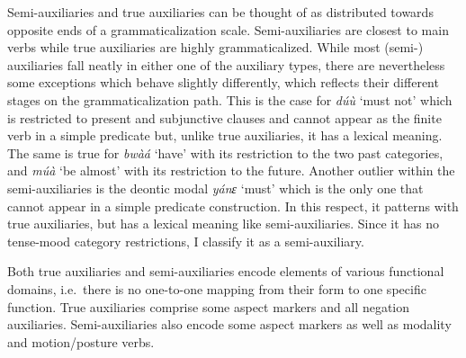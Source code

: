 Semi-auxiliaries and true auxiliaries can be thought of as distributed towards opposite ends of a grammaticalization scale. Semi-auxiliaries are closest to main verbs while true auxiliaries are highly grammaticalized. 
While most (semi-) auxiliaries fall neatly in either one of the auxiliary types, there are nevertheless some exceptions which behave slightly differently, which reflects their different stages on the grammaticalization path. This is the case for {\itshape dúù} `must not' which is restricted to present and subjunctive clauses and cannot appear as the finite verb in a simple predicate but, unlike true auxiliaries, it has a lexical meaning. The same is true for {\itshape bwàá} `have' with its restriction to the two past categories, and {\itshape múà} `be almost' with its restriction to the future.
Another outlier within the semi-auxiliaries is the deontic modal {\itshape yánɛ} `must' which is the only one that cannot appear in a simple predicate construction. In this respect, it patterns with true auxiliaries, but has a lexical meaning like semi-auxiliaries. Since it has no tense-mood category restrictions, I classify it as a semi-auxiliary.

Both true auxiliaries and semi-auxiliaries encode elements of various functional domains, i.e.\ there is no one-to-one mapping from their form to one specific function.  True auxiliaries comprise some aspect markers and all negation auxiliaries. Semi-auxiliaries also encode some aspect markers as well as modality and motion/posture verbs.


















